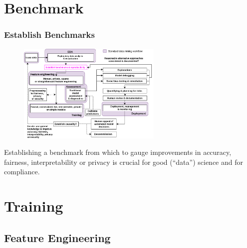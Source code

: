 \documentclass[11pt,
               aspectratio=169,
               hyperref={colorlinks}
               ]{beamer}
\begin{document}
	\section{Benchmark}
	
		\begin{frame}
		
			\frametitle{Establish Benchmarks}		

			\begin{figure}[htb]
				\begin{center}
					\includegraphics[height=135pt]{img/bench.png}
				\end{center}
			\end{figure}	

			\centering
			Establishing a benchmark from which to gauge improvements in accuracy, fairness, interpretability or privacy is crucial for good (``data'') science and for compliance. 
		
		\end{frame}


	\section{Training}

		\subsection{Feature Engineering}
\end{document}
